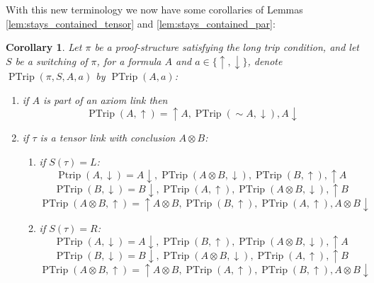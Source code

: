 \documentclass[12pt]{article}
\theoremstyle{plain}
\newtheorem{cor}[thm]{Corollary}
\theoremstyle{definition}
\newcommand{\negation}{\sim}
\begin{document}
With this new terminology we now have some corollaries of Lemmas \ref{lem:stays_contained_tensor} and \ref{lem:stays_contained_par}:
\begin{cor}\label{cor:pretrip_innards}
Let $\pi$ be a proof-structure satisfying the long trip condition, and let $S$ be a switching of $\pi$, for a formula $A$ and $a \in \lbrace \uparrow, \downarrow\rbrace$, denote $\operatorname{PTrip}(\pi,S, A, a)$ by $\operatorname{PTrip}(A,a)$:
\begin{enumerate}
    \item if $A$ is part of an axiom link then
    \begin{equation}
        \operatorname{PTrip}(A,\uparrow) = \uparrow A, \operatorname{PTrip}(\negation A, \downarrow), A \downarrow
    \end{equation}
    \item if $\tau$ is a tensor link with conclusion $A \otimes B$:
    \begin{enumerate}
        \item if $S(\tau) = L$:
    \begin{equation}
        \operatorname{Ptrip}(A, \downarrow) = A\downarrow, \operatorname{PTrip}(A \otimes B, \downarrow), \operatorname{PTrip}(B, \uparrow), \uparrow A
    \end{equation}
    \begin{equation}
        \operatorname{PTrip}(B, \downarrow) = B\downarrow, \operatorname{PTrip}(A,\uparrow), \operatorname{PTrip}(A \otimes B, \downarrow), \uparrow B
    \end{equation}
    \begin{equation}
        \operatorname{PTrip}(A \otimes B, \uparrow) = \uparrow A \otimes B, \operatorname{PTrip}(B, \uparrow), \operatorname{PTrip}(A,\uparrow), A \otimes B \downarrow
    \end{equation}
        \item if $S(\tau) = R$:
    \begin{equation}
        \operatorname{PTrip}(A, \downarrow) = A\downarrow, \operatorname{PTrip}(B, \uparrow),\operatorname{PTrip}(A \otimes B, \downarrow), \uparrow A
    \end{equation}
    \begin{equation}
        \operatorname{PTrip}(B, \downarrow) = B\downarrow,  \operatorname{PTrip}(A \otimes B, \downarrow), \operatorname{PTrip}(A,\uparrow),\uparrow B
    \end{equation}
    \begin{equation}
        \operatorname{PTrip}(A \otimes B, \uparrow) = \uparrow A \otimes B,  \operatorname{PTrip}(A,\uparrow), \operatorname{PTrip}(B, \uparrow),A \otimes B \downarrow

\end{equation}
\end{enumerate}
\end{enumerate}
\end{cor}
\end{document}
